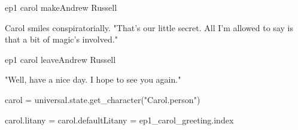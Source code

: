 \documentclass{book}
\begin{document}
\begin{childnode}{ep1 carol make}{Andrew Russell}

    Carol smiles conspiratorially. "That's our little secret. All I'm allowed to say is that a bit of magic's involved."



\end{childnode}

\begin{childnode}{ep1 carol leave}{Andrew Russell}

    "Well, have a nice day. I hope to see you again."

    \begin{code}

        carol = universal.state.get_character("Carol.person")

        carol.litany = carol.defaultLitany = ep1_carol_greeting.index

    \end{code}

\end{childnode}
\end{document}

